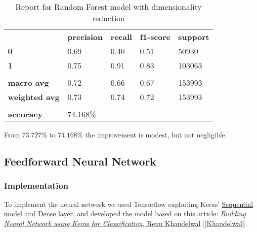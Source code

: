 \begin{table}[h]
    \centering
    \begin{tabular}{lllll}
        \rowcolor[HTML]{EEEEEE} 
        \cellcolor[HTML]{FBFBFB} & \textbf{precision} & \textbf{recall} & \textbf{f1-score} & \textbf{support} \\
        \rowcolor[HTML]{EEEEEE} 
        \textbf{0}               & 0.69               & 0.40            & 0.51              & 50930            \\
        \rowcolor[HTML]{EEEEEE} 
        \textbf{1}               & 0.75               & 0.91            & 0.83              & 103063           \\
        \rowcolor[HTML]{FBFBFB} 
        &                    &                 &                   &                  \\
        \rowcolor[HTML]{EEEEEE} 
        \textbf{macro avg}       & 0.72               & 0.66            & 0.67              & 153993           \\
        \rowcolor[HTML]{EEEEEE} 
        \textbf{weighted avg}    & 0.73               & 0.74            & 0.72              & 153993           \\
        \rowcolor[HTML]{FBFBFB} 
        &                    &                 &                   &                  \\
        \rowcolor[HTML]{EEEEEE} 
        \textbf{accuracy}        & \multicolumn{4}{l}{\cellcolor[HTML]{EEEEEE}74.168\%}                         
    \end{tabular}
    \caption{Report for Random Forest model with dimensionality reduction}
    \label{tab:rf-res-1}
\end{table}

From $73.727\%$ to $74.168\%$ the improvement is modest, but not negligible.


\subsection{Feedforward Neural Network}

\subsubsection{Implementation}

To implement the neural network we used Tensorflow exploiting Keras' \href{https://www.tensorflow.org/api_docs/python/tf/keras/Sequential}{Sequential model} and \href{https://www.tensorflow.org/api_docs/python/tf/keras/layers/Dense}{Dense layer}, and developed the model based on this article: \href{https://medium.com/datadriveninvestor/building-neural-network-using-keras-for-classification-3a3656c726c1}{\textit{Building Neural Network using Keras for Classification}, Renu Khandelwal} [\ref{Khandelwal}].

